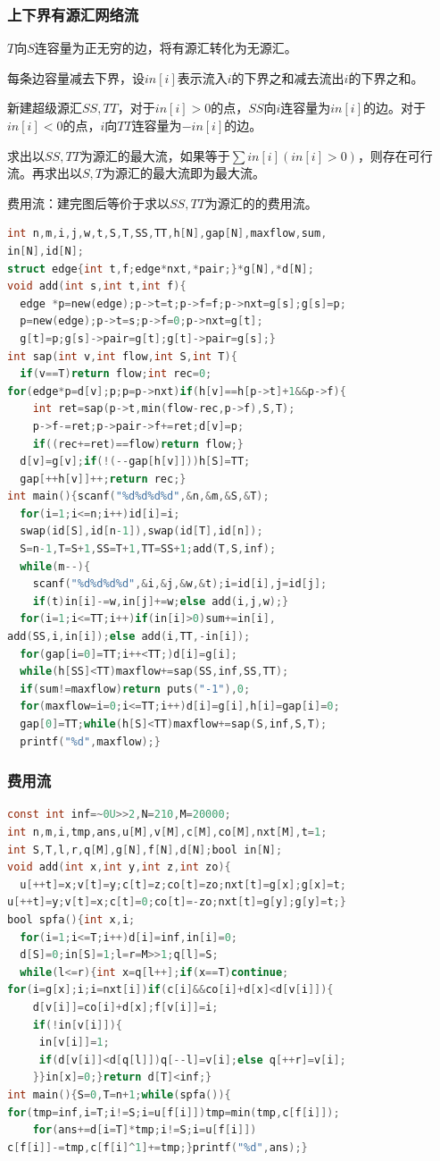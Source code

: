 \documentclass[UTF8,a4paper,titlepage]{ctexart}
\begin{document}
            \subsubsection*{上下界有源汇网络流}
$T$向$S$连容量为正无穷的边，将有源汇转化为无源汇。\par
每条边容量减去下界，设$in[i]$表示流入$i$的下界之和减去流出$i$的下界之和。\par
新建超级源汇$SS,TT$，对于$in[i]>0$的点，$SS$向$i$连容量为$in[i]$的边。对于$in[i]<0$的点，$i$向$TT$连容量为$-in[i]$的边。\par
求出以$SS,TT$为源汇的最大流，如果等于$\sum in[i](in[i]>0)$，则存在可行流。再求出以$S,T$为源汇的最大流即为最大流。\par
费用流：建完图后等价于求以$SS,TT$为源汇的的费用流。
\begin{lstlisting}[language=C]
int n,m,i,j,w,t,S,T,SS,TT,h[N],gap[N],maxflow,sum,
in[N],id[N];
struct edge{int t,f;edge*nxt,*pair;}*g[N],*d[N];
void add(int s,int t,int f){
  edge *p=new(edge);p->t=t;p->f=f;p->nxt=g[s];g[s]=p;
  p=new(edge);p->t=s;p->f=0;p->nxt=g[t];
  g[t]=p;g[s]->pair=g[t];g[t]->pair=g[s];}
int sap(int v,int flow,int S,int T){
  if(v==T)return flow;int rec=0;
for(edge*p=d[v];p;p=p->nxt)if(h[v]==h[p->t]+1&&p->f){
    int ret=sap(p->t,min(flow-rec,p->f),S,T);
    p->f-=ret;p->pair->f+=ret;d[v]=p;
    if((rec+=ret)==flow)return flow;}
  d[v]=g[v];if(!(--gap[h[v]]))h[S]=TT;
  gap[++h[v]]++;return rec;}
int main(){scanf("%d%d%d%d",&n,&m,&S,&T);
  for(i=1;i<=n;i++)id[i]=i;
  swap(id[S],id[n-1]),swap(id[T],id[n]);
  S=n-1,T=S+1,SS=T+1,TT=SS+1;add(T,S,inf);
  while(m--){
    scanf("%d%d%d%d",&i,&j,&w,&t);i=id[i],j=id[j];
    if(t)in[i]-=w,in[j]+=w;else add(i,j,w);}
  for(i=1;i<=TT;i++)if(in[i]>0)sum+=in[i],
add(SS,i,in[i]);else add(i,TT,-in[i]);
  for(gap[i=0]=TT;i++<TT;)d[i]=g[i];
  while(h[SS]<TT)maxflow+=sap(SS,inf,SS,TT);
  if(sum!=maxflow)return puts("-1"),0;
  for(maxflow=i=0;i<=TT;i++)d[i]=g[i],h[i]=gap[i]=0;
  gap[0]=TT;while(h[S]<TT)maxflow+=sap(S,inf,S,T);
  printf("%d",maxflow);}
\end{lstlisting}
            \subsubsection*{费用流}
\begin{lstlisting}[language=C]
const int inf=~0U>>2,N=210,M=20000;
int n,m,i,tmp,ans,u[M],v[M],c[M],co[M],nxt[M],t=1;
int S,T,l,r,q[M],g[N],f[N],d[N];bool in[N];
void add(int x,int y,int z,int zo){
  u[++t]=x;v[t]=y;c[t]=z;co[t]=zo;nxt[t]=g[x];g[x]=t;
u[++t]=y;v[t]=x;c[t]=0;co[t]=-zo;nxt[t]=g[y];g[y]=t;}
bool spfa(){int x,i;
  for(i=1;i<=T;i++)d[i]=inf,in[i]=0;
  d[S]=0;in[S]=1;l=r=M>>1;q[l]=S;
  while(l<=r){int x=q[l++];if(x==T)continue;
for(i=g[x];i;i=nxt[i])if(c[i]&&co[i]+d[x]<d[v[i]]){
    d[v[i]]=co[i]+d[x];f[v[i]]=i;
    if(!in[v[i]]){
     in[v[i]]=1;
     if(d[v[i]]<d[q[l]])q[--l]=v[i];else q[++r]=v[i];
    }}in[x]=0;}return d[T]<inf;}
int main(){S=0,T=n+1;while(spfa()){
for(tmp=inf,i=T;i!=S;i=u[f[i]])tmp=min(tmp,c[f[i]]);
    for(ans+=d[i=T]*tmp;i!=S;i=u[f[i]])
c[f[i]]-=tmp,c[f[i]^1]+=tmp;}printf("%d",ans);}
\end{lstlisting}
\end{document}
